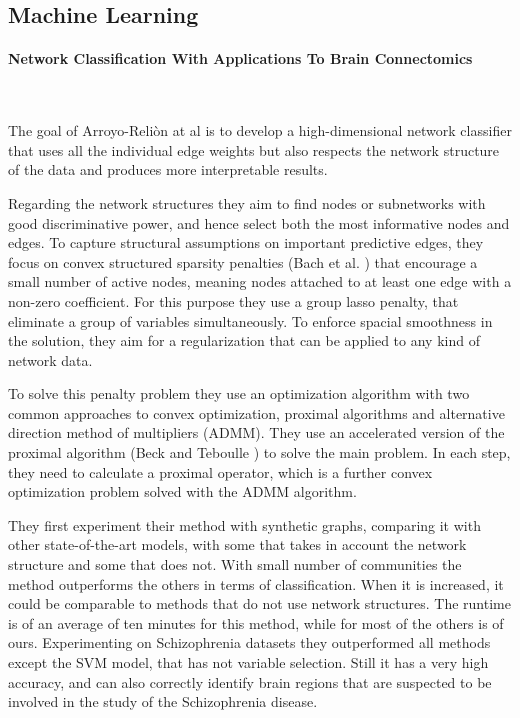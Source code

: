 \subsection{Machine Learning}
\paragraph{Network Classification With Applications To Brain Connectomics}\
\label{par:3}
\vspace{0.5cm}

The goal of Arroyo-Reliòn at al \cite{Arroyo_Reli_n_2019} is to develop a high-dimensional network classifier that uses all the individual edge weights but also respects the network structure of the data and produces more interpretable results. 
\vspace{0.5cm}

Regarding the network structures they aim to find nodes or subnetworks with good discriminative power, and hence select both the most informative nodes and edges. To capture structural assumptions on important predictive edges, they focus on convex structured sparsity penalties (Bach et al. \cite{bach2012structured}) that encourage a small number of active nodes, meaning nodes attached to at least one edge with a non-zero coefficient. For this purpose they use a group lasso penalty, that eliminate a group of variables simultaneously. To enforce spacial smoothness in the solution, they aim for a regularization that can be applied to any kind of network data.
\vspace{0.5cm}

To solve this penalty problem they use an optimization algorithm with two common approaches to convex optimization, proximal algorithms and alternative direction method of multipliers (ADMM). They use an accelerated version of the proximal algorithm (Beck and Teboulle \cite{beck2009fast}) to solve the main problem. In each step, they need to calculate a proximal operator, which is a further convex optimization problem solved with the ADMM algorithm.
\vspace{0.5cm}

They first experiment their method with synthetic graphs, comparing it with other state-of-the-art models, with some that takes in account the network structure and some that does not. With small number of communities the method outperforms the others in terms of classification. When it is increased, it could be comparable to methods that do not use network structures. The runtime is of an average of ten minutes for this method, while for most of the others is of ours. 
Experimenting on Schizophrenia datasets they outperformed all methods except the SVM model, that has not variable selection. Still it has a very high accuracy, and can also correctly identify brain regions that are suspected to be involved in the study of the Schizophrenia disease. 

